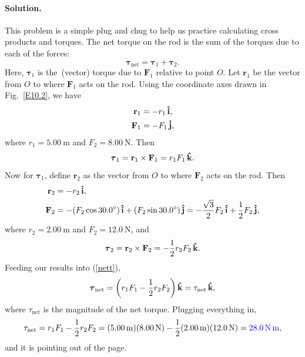 \documentclass[11pt]{article}
\newcommand{\refeq}[1]{(\ref{#1})}
\newcommand{\beq}{\begin{equation*}}
\newcommand{\eeq}{\end{equation*}}
\newcommand{\beqn}{\begin{equation}}
\newcommand{\eeqn}{\end{equation}}
\newenvironment{solution}
{
    \paragraph{Solution.}
    \ignorespaces
}
{
    \bigskip
}
\renewcommand{\vec}[1]{\mathbf{#1}}
\begin{document}
\newcommand{\vF}{\vec{F}}
\newcommand{\vt}{\boldsymbol{\tau}}
\newcommand{\vr}{\vec{r}}

\newcommand{\vFq}{\vF_1}
\newcommand{\Fq}{F_1}
\newcommand{\vFw}{\vF_2}
\newcommand{\Fw}{F_2}

\newcommand{\vtq}{\vt_1}
\newcommand{\vtw}{\vt_2}
\newcommand{\vrq}{\vr_1}
\newcommand{\rrq}{r_1}
\newcommand{\vrw}{\vr_2}
\newcommand{\rw}{r_2}

\newcommand{\vtnet}{\vt_\text{net}}
\newcommand{\tnet}{\tau_\text{net}}


\begin{solution}
	This problem is a simple plug and chug to help us practice calculating cross products and torques.  The net torque on the rod is the sum of the torques due to each of the forces:
	\beqn \label{nett}
		\vtnet = \vtq + \vtw.
	\eeqn
	Here, $\vtq$ is the~(vector) torque due to $\vFq$ relative to point $O$.  Let $\vrq$ be the vector from $O$ to where $\vFq$ acts on the rod.  Using the coordinate axes drawn in Fig.~\ref{E10.2}, we have
	\begin{align*}
		\vrq &= -\rrq \ih, \\
		\vFq &= -\Fq \jh,
	\end{align*}
	where $\rrq = \SI{5.00}{\meter}$ and $\Fw = \SI{8.00}{\newton}$.  Then
	\beq
		\vtq = \vrq \times \vFq = \rrq \Fq \kh.
	\eeq
	Now for $\vtq$, define $\vrw$ as the vector from $O$ to where $\vFw$ acts on the rod.  Then
		\begin{align*}
		\vrw &= -\rw \ih, \\
		\vFw &= -(\Fw \cos{30.0^\circ}) \ih + (\Fw \sin{30.0^\circ}) \jh = -\frac{\sqrt{3}}{2} \Fw \ih + \frac{1}{2} \Fw \jh,
	\end{align*}
	where $\rw = \SI{2.00}{\meter}$ and $\Fw = \SI{12.0}{\newton}$, and
	\beq
		\vtw = \vrw \times \vFw = -\frac{1}{2} \rw \Fw \kh.
	\eeq
	Feeding our results into \refeq{nett},
	\beq
		\vtnet = \left( \rrq \Fq - \frac{1}{2} \rw \Fw \right)\!\kh = \tnet \kh,
	\eeq
	where $\tnet$ is the magnitude of the net torque.  Plugging everything in,
	\beq
		\tnet = \rrq \Fq - \frac{1}{2} \rw \Fw = (\SI{5.00}{\meter}) (\SI{8.00}{\newton}) - \frac{1}{2} (\SI{2.00}{\meter}) (\SI{12.0}{\newton}) = {\color{blue} \SI{28.0}{\newton\meter}},
	\eeq
	and it is pointing {\color{blue} out of the page}.
\end{solution}

\newcommand{\mb}{m_b}
\newcommand{\mw}{m_w}
\newcommand{\mmp}{m_p}

\newcommand{\simb}{\SI{12.0}{\kg} }
\newcommand{\simw}{\SI{5.00}{\kg} }
\newcommand{\simp}{\SI{2.00}{\kg} }
\newcommand{\sIip}{\SI{0.0625}{\kg\square\meter} }
\end{document}
